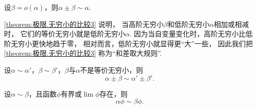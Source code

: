 \begin{proposition}[和差取大规则]\label{theorem:极限.无穷小的比较3}
设\(\beta=o(\alpha)\)，则\(\alpha\pm\beta\sim\alpha\).
\end{proposition}
\cref{theorem:极限.无穷小的比较3} 说明，
当高阶无穷小\(\beta\)和低阶无穷小\(\alpha\)相加或相减时，
它们的等价无穷小就是低阶无穷小\(\alpha\).
因为当自变量变化时，高阶无穷小比低阶无穷小更快地趋于零，
相对而言，低阶无穷小就显得更“大”一些，
因此我们把\cref{theorem:极限.无穷小的比较3} 称为“和差取大规则”.

\begin{proposition}[和差代替规则]\label{theorem:极限.无穷小的比较4}
设\(\alpha\sim\alpha'\)，\(\beta\sim\beta'\)，\(\beta\)与\(\alpha\)不是等价无穷小，则\[
	\alpha\pm\beta\sim\alpha'\pm\beta'.
\]
\end{proposition}

\begin{proposition}[因式代替规则]\label{theorem:极限.无穷小的比较5}
设\(\alpha\sim\beta\)，且函数\(\phi\)有界或\(\lim\phi\)存在，则\[
	\alpha \phi \sim \beta \phi.
\]
\end{proposition}
